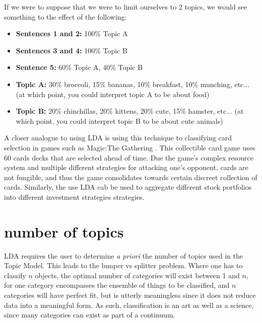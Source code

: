 If we were to suppose that we were to limit ourselves to 2 topics, we would see something to the effect of the following:


	\begin{itemize}
	\item \textbf{Sentences 1 and 2:} 100\% Topic A
	\item \textbf{Sentences 3 and 4:} 100\% Topic B
	\item \textbf{Sentence 5:} 60\% Topic A, 40\% Topic B
	\item \textbf{Topic A:} 30\% broccoli, 15\% bananas, 10\% breakfast, 10\% munching, etc... (at which point, you could interpret topic A to be about food)
	\item \textbf{Topic B:} 20\% chinchillas, 20\% kittens, 20\% cute, 15\% hamster, etc...  (at which point, you could interpret topic B to be about cute animals)
	\end{itemize}


A closer analogue to using LDA is using this technique to classifying card selection in games such as Magic:The Gathering \citep{Hlynsson2017}.  This collectible card game uses 60 cards decks that are selected ahead of time.  Due the game's complex resource system and multiple different strategies for attacking one's opponent, cards are not fungible, and thus the game consolidates towards certain discreet collection of cards.  Similarly, the use LDA cab be used to aggregate different stock portfolios into different investment strategies strategies.  

\section{number of topics}
LDA requires the user to determine \textit{a priori} the number of topics used in the Topic Model.  This leads to the lumper vs splitter problem.  Where one has to classify $n$ objects, the optimal number of categories will exist between 1 and $n$, for one category encompasses the ensemble of things to be classified, and $n$ categories will have perfect fit, but is utterly meaningless since it does not reduce data into a meaningful form.  As such, classification is an art as well as a science, since many categories can exist as part of a continuum.

